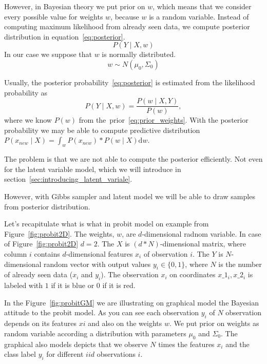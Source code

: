 However, in Bayesian theory we put prior on $w$, which means that we consider every possible value for weights $w$, because $w$ is a random variable. Instead of computing maximum likelihood from already seen data, we compute posterior distribution in equation~\ref{eq:posterior}.
\begin{equation}\label{eq:posterior}
    P(Y \mid X, w) 
\end{equation}
In our case we suppose that $w$ is normally distributed.
\begin{equation}\label{eq:prior_weights}
w \sim N(\mu_0, \Sigma_0)
\end{equation}

Usually, the posterior probability~\ref{eq:posterior} is estimated from the likelihood probability as
\begin{equation}
    P(Y \mid X, w) = \frac{P(w \mid X,Y)}{P(w)},
\end{equation}
where we know $P(w)$ from the~prior~\ref{eq:prior_weights}.
With the posterior probability we may be able to compute predictive distribution 
$P(x_{new} \mid X) = \int_w P(x_{new}) * P(w \mid X) \mathrm{d} w $.

The problem is that we are not able to compute the posterior efficiently. Not even for the latent variable model, which we will introduce in section~\ref{sec:introducing_latent_variale}.

However, with Gibbs sampler and latent model we will be able to draw samples from posterior distribution.

Let's recapitulate what is what in probit model on example from Figure~\ref{fig:probit2D}.
The weights, $w$, are $d$-dimensional radnom variable. In case of Figure~\ref{fig:probit2D} $d=2$.
The $X$ is $(d*N)$-dimensional matrix, where column $i$ contains $d$-dimensional features $x_i$ of observation $i$.
The $Y$ is $N$-dimensional random vector with output values $y_i \in \{0,1\}$, where $N$ is the number of already seen data ($x_i$ and $y_i$).
The observation $x_i$ on coordinates $x\_1_i,x\_2_i$ is labeled with $1$ if it is blue or $0$ if it is red.

In the Figure~\ref{fig:probitGM} we are illustrating on graphical model the Bayesian attitude to the probit model. As you can see each observation $y_i$ of $N$ observation depends on its features $xi$ and also on the weights $w$. We put prior on weights as random variable according a distribution with parameters $\mu_0$ and $\Sigma_0$. The graphical also models depicts that we observe $N$ times the features $x_i$ and the class label $y_i$ for different $iid$ observations $i$.

